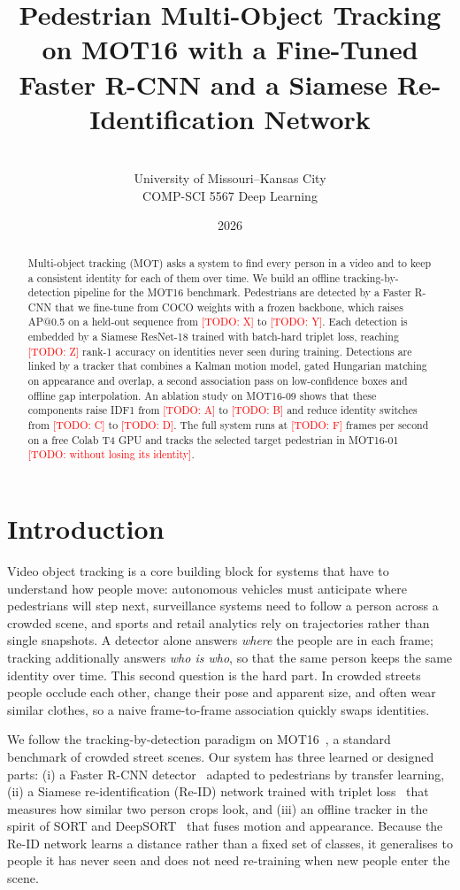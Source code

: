 \documentclass[11pt,letterpaper]{article}
\title{Pedestrian Multi-Object Tracking on MOT16 with a Fine-Tuned Faster R-CNN and a Siamese Re-Identification Network}
\author{\todo{Team member names} \\ University of Missouri--Kansas City \\ COMP-SCI 5567 Deep Learning}
\date{\todo{Month} 2026}
\newcommand{\todo}[1]{\textcolor{red}{[TODO: #1]}}
\begin{document}
\maketitle

\begin{abstract}
Multi-object tracking (MOT) asks a system to find every person in a video and to keep a consistent identity for each of them over time. We build an offline tracking-by-detection pipeline for the MOT16 benchmark. Pedestrians are detected by a Faster R-CNN that we fine-tune from COCO weights with a frozen backbone, which raises AP@0.5 on a held-out sequence from \todo{X} to \todo{Y}. Each detection is embedded by a Siamese ResNet-18 trained with batch-hard triplet loss, reaching \todo{Z} rank-1 accuracy on identities never seen during training. Detections are linked by a tracker that combines a Kalman motion model, gated Hungarian matching on appearance and overlap, a second association pass on low-confidence boxes and offline gap interpolation. An ablation study on MOT16-09 shows that these components raise IDF1 from \todo{A} to \todo{B} and reduce identity switches from \todo{C} to \todo{D}. The full system runs at \todo{F} frames per second on a free Colab T4 GPU and tracks the selected target pedestrian in MOT16-01 \todo{without losing its identity}.
\end{abstract}

\section{Introduction}
Video object tracking is a core building block for systems that have to understand how people move: autonomous vehicles must anticipate where pedestrians will step next, surveillance systems need to follow a person across a crowded scene, and sports and retail analytics rely on trajectories rather than single snapshots. A detector alone answers \emph{where} the people are in each frame; tracking additionally answers \emph{who is who}, so that the same person keeps the same identity over time. This second question is the hard part. In crowded streets people occlude each other, change their pose and apparent size, and often wear similar clothes, so a naive frame-to-frame association quickly swaps identities.

We follow the tracking-by-detection paradigm on MOT16~\cite{milan2016mot16}, a standard benchmark of crowded street scenes. Our system has three learned or designed parts: (i) a Faster R-CNN detector~\cite{ren2015faster} adapted to pedestrians by transfer learning, (ii) a Siamese re-identification (Re-ID) network trained with triplet loss~\cite{schroff2015facenet,hermans2017triplet} that measures how similar two person crops look, and (iii) an offline tracker in the spirit of SORT and DeepSORT~\cite{bewley2016sort,wojke2017deepsort} that fuses motion and appearance. Because the Re-ID network learns a distance rather than a fixed set of classes, it generalises to people it has never seen and does not need re-training when new people enter the scene.
\end{document}

